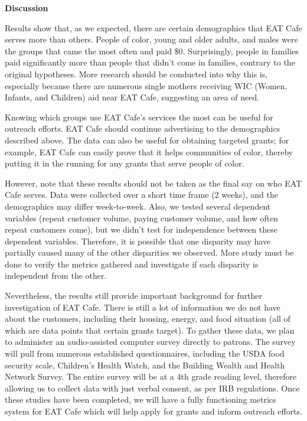 \textbf{Discussion}

Results show that, as we expected, there are certain demographics that EAT Cafe serves more than others. People of color, young and older adults, and males were the groups that came the most often and paid \$0. Surprisingly, people in families paid significantly more than people that didn’t come in families, contrary to the original hypotheses. More research should be conducted into why this is, especially because there are numerous single mothers receiving WIC (Women, Infants, and Children) aid near EAT Cafe, suggesting an area of need.

Knowing which groups use EAT Cafe’s services the most can be useful for outreach efforts. EAT Cafe should continue advertising to the demographics described above. The data can also be useful for obtaining targeted grants; for example, EAT Cafe can easily prove that it helps communities of color, thereby putting it in the running for any grants that serve people of color.

However, note that these results should not be taken as the final say on who EAT Cafe serves. Data were collected over a short time frame (2 weeks), and the demographics may differ week-to-week. Also, we tested several dependent variables (repeat customer volume, paying customer volume, and how often repeat customers come), but we didn’t test for independence between these dependent variables. Therefore, it is possible that one disparity may have partially caused many of the other disparities we observed. More study must be done to verify the metrics gathered and investigate if each disparity is independent from the other.

Nevertheless, the results still provide important background for further investigation of EAT Cafe. There is still a lot of information we do not have about the customers, including their housing, energy, and food situation (all of which are data points that certain grants target). To gather these data, we plan to administer an audio-assisted computer survey directly to patrons. The survey will pull from numerous established questionnaires, including the USDA food security scale, Children’s Health Watch, and the Building Wealth and Health Network Survey. The entire survey will be at a 4th grade reading level, therefore allowing us to collect data with just verbal consent, as per IRB regulations. Once these studies have been completed, we will have a fully functioning metrics system for EAT Cafe which will help apply for grants and inform outreach efforts.


